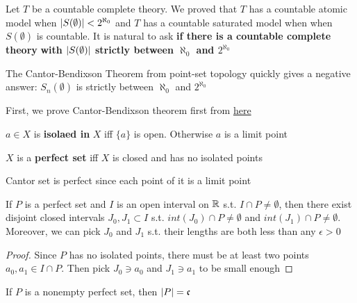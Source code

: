 \documentclass[11pt]{article}
\begin{document}
Let \(T\) be a countable complete theory. We proved that \(T\) has a countable atomic model
when \(\abs{S(\emptyset)}<2^{\aleph_0}\) and \(T\) has a countable saturated model when
when \(S(\emptyset)\) is countable. It is natural to ask \textbf{if there is a countable complete theory}
\textbf{with \(\abs{S(\emptyset)}\) strictly between \(\aleph_0\) and \(2^{\aleph_0}\)}

The Cantor-Bendixson Theorem from point-set topology quickly gives a negative answer: \(S_n(\emptyset)\)
is strictly between \(\aleph_0\) and \(2^{\aleph_0}\)

First, we prove Cantor-Bendixson theorem first from \href{http://ozark.hendrix.edu/\~yorgey/settheory/08-more-real-line.pdf}{here}

\begin{definition}[]
\(a\in X\) is \textbf{isolaed in} \(X\) iff \(\{a\}\) is open. Otherwise \(a\) is a limit point
\end{definition}


\begin{definition}[]
\(X\) is a \textbf{perfect set} iff \(X\) is closed and has no isolated points
\end{definition}

Cantor set is perfect since each point of it is a limit point

\begin{lemma}[]
\label{K1}
If \(P\) is a perfect set and \(I\) is an open interval on \(\mathbb{R}\) s.t. \(I\cap P\neq\emptyset\), then there
exist disjoint closed intervals \(J_0,J_1\subset I\) s.t. \(int(J_0)\cap P\neq\emptyset\) and \(int(J_1)\cap P\neq\emptyset\).
Moreover, we can pick \(J_0\) and \(J_1\) s.t. their lengths are both less than any \(\epsilon>0\)
\end{lemma}

\begin{proof}
Since \(P\) has no isolated points, there must be at least two points \(a_0,a_1\in I\cap P\). Then
pick \(J_0\ni a_0\) and \(J_1\ni a_1\) to be small enough
\end{proof}

\begin{lemma}[]
If \(P\) is a nonempty perfect set, then \(\abs{P}=\fc\)
\end{lemma}
\end{document}
